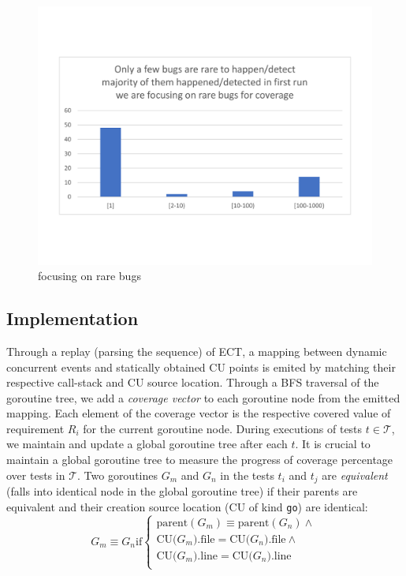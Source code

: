 \begin{figure}
\centering
  \includegraphics[width=.95\linewidth]{figs/coverage_motivation_tentative.pdf}
  \caption{focusing on rare bugs}
  \label{fig:rare_bugs}
\end{figure}



\subsection{Implementation}
Through a replay (\ie parsing the sequence) of ECT, a mapping between dynamic concurrent events and statically obtained CU points is emited by matching their respective call-stack and CU source location.
%
Through a BFS traversal of the goroutine tree, we add a \textit{coverage vector} to each goroutine node from the emitted mapping. Each element of the coverage vector is the respective covered value of requirement $R_i$ for the current goroutine node.
%
During executions of tests $t \in \mathcal{T}$, we maintain and update a global goroutine tree after each $t$.
%
It is crucial to maintain a global goroutine tree to measure the progress of coverage percentage over tests in $\mathcal{T}$.
%
Two goroutines $G_m$ and $G_n$ in the tests $t_i$ and $t_j$ are \textit{equivalent} (\ie falls into identical node in the global goroutine tree) if their parents are equivalent and their creation source location (CU of kind \texttt{go}) are identical:
\begin{equation}
  G_m \equiv G_n   \text{if}
  \begin{cases}
    \text{parent}(G_m) \equiv \text{parent}(G_n)  \wedge \\
    \text{CU(}G_m\text{).file} = \text{CU(}G_n\text{).file}  \wedge\\
    \text{CU(}G_m\text{).line} = \text{CU(}G_n\text{).line} \\
  \end{cases}
\end{equation}





